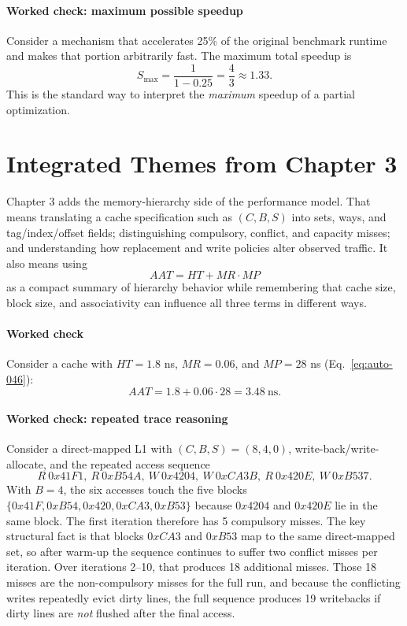 \paragraph{Worked check: maximum possible speedup}\label{par:auto-026a}
Consider a mechanism that accelerates 25\% of the original benchmark runtime and makes that portion arbitrarily fast.
The maximum total speedup is
\begin{equation}\label{eq:auto-045a}
    S_{\max}=\frac{1}{1-0.25}=\frac{4}{3}\approx 1.33.
\end{equation}
This is the standard way to interpret the \emph{maximum} speedup of a partial optimization.


\section{Integrated Themes from Chapter 3}\label{sec:auto-048}
Chapter 3 adds the memory-hierarchy side of the performance model.
That means translating a cache specification such as $(C,B,S)$ into sets, ways, and tag/index/offset fields; distinguishing compulsory, conflict, and capacity misses; and understanding how replacement and write policies alter observed traffic.
It also means using
\[
    AAT=HT+MR\cdot MP
\]
as a compact summary of hierarchy behavior while remembering that cache size, block size, and associativity can influence all three terms in different ways.

\paragraph{Worked check}\label{par:auto-027}
Consider a cache with $HT=1.8$ ns, $MR=0.06$, and $MP=28$ ns (Eq.~\eqref{eq:auto-046}):
\begin{equation}\label{eq:auto-046}
    AAT = 1.8 + 0.06\cdot 28 = 3.48\ \text{ns}.
\end{equation}

\paragraph{Worked check: repeated trace reasoning}\label{par:auto-027a}
Consider a direct-mapped L1 with $(C,B,S)=(8,4,0)$, write-back/write-allocate, and the repeated access sequence
\begin{equation}\label{eq:auto-046a}
    R\ 0x41F1,\ R\ 0xB54A,\ W\ 0x4204,\ W\ 0xCA3B,\ R\ 0x420E,\ W\ 0xB537.
\end{equation}
With $B=4$, the six accesses touch the five blocks $\{0x41F,0xB54,0x420,0xCA3,0xB53\}$ because $0x4204$ and $0x420E$ lie in the same block.
The first iteration therefore has 5 compulsory misses.
The key structural fact is that blocks $0xCA3$ and $0xB53$ map to the same direct-mapped set, so after warm-up the sequence continues to suffer two conflict misses per iteration.
Over iterations 2--10, that produces 18 additional misses.
Those 18 misses are the non-compulsory misses for the full run, and because the conflicting writes repeatedly evict dirty lines, the full sequence produces 19 writebacks if dirty lines are \emph{not} flushed after the final access.

